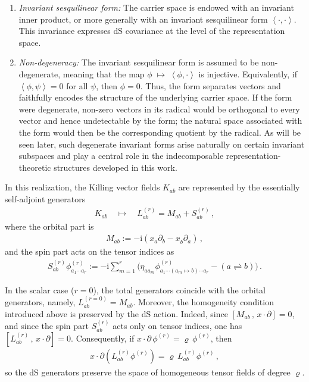 \documentclass[aps,twocolumn,nofootinbib]{revtex4}
\begin{document}
\begin{enumerate}
    \item{\emph{Invariant sesquilinear form:} The carrier space is endowed with an invariant inner product, or more generally with an invariant sesquilinear form $\left\langle\cdot , \cdot\right\rangle$. This invariance expresses dS covariance at the level of the representation space.}

    \item{\emph{Non-degeneracy:} The invariant sesquilinear form is assumed to be non-degenerate, meaning that the map $\phi \;\longmapsto\; \left\langle \phi,\cdot\right\rangle$ is injective. Equivalently, if $\left\langle \phi,\psi\right\rangle=0$ for all $\psi$, then $\phi=0$. Thus, the form separates vectors and faithfully encodes the structure of the underlying carrier space. If the form were degenerate, non-zero vectors in its radical would be orthogonal to every vector and hence undetectable by the form; the natural space associated with the form would then be the corresponding quotient by the radical. As will be seen later, such degenerate invariant forms arise naturally on certain invariant subspaces and play a central role in the indecomposable representation-theoretic structures developed in this work.}
\end{enumerate}

In this realization, the Killing vector fields $K_{ab}$ are represented by the essentially self-adjoint generators
\begin{align}
    K^{}_{ab} \quad\longmapsto\quad L^{(r)}_{ab} = M^{}_{ab} + S^{(r)}_{ab} \,,
\end{align}
where the orbital part is
\begin{align}
    M^{}_{ab} := -\mathrm{i}\left(x^{}_a\partial^{}_b - x^{}_b\partial^{}_a\right) \,,
\end{align}
and the spin part acts on the tensor indices as
\begin{align}
    S^{(r)}_{ab}\phi^{(r)}_{a_1\cdots a_r}
    := -\mathrm{i}\sum_{m=1}^r \Big( \eta_{a a_m}\phi^{(r)}_{a_1\cdots(a_m\mapsto b)\cdots a_r} - (a\rightleftharpoons b) \Big) \,.
\end{align}

In the scalar case ($r=0$), the total generators coincide with the orbital generators, namely, $L^{(r=0)}_{ab}=M^{}_{ab}$. Moreover, the homogeneity condition introduced above is preserved by the dS action. Indeed, since $[M_{ab} \,,\, x\cdot\partial]=0$, and since the spin part $S^{(r)}_{ab}$ acts only on tensor indices, one has $[L^{(r)}_{ab} \,,\, x\cdot\partial]=0$. Consequently, if $x\cdot\partial\,\phi^{(r)}=\varrho\,\phi^{(r)}$, then
\begin{align}
    x\cdot\partial\left(L^{(r)}_{ab}\phi^{(r)}\right) = \varrho\,L^{(r)}_{ab}\phi^{(r)} \,,
\end{align}
so the dS generators preserve the space of homogeneous tensor fields of degree $\varrho$.
\end{document}
